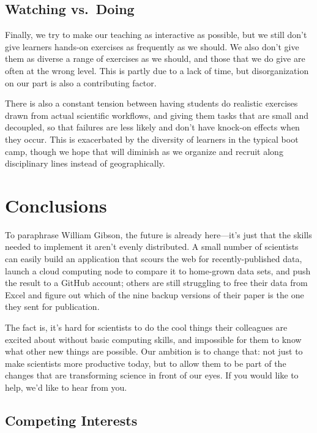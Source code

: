 \documentclass[10pt,a4paper,twocolumn]{article}
\begin{document}
\subsection*{Watching vs.~Doing}

Finally, we try to make our teaching as interactive as possible, but we
still don't give learners hands-on exercises as frequently as we should.
We also don't give them as diverse a range of exercises as we should,
and those that we do give are often at the wrong level. This is partly
due to a lack of time, but disorganization on our part is also a
contributing factor.

There is also a constant tension between having students do realistic
exercises drawn from actual scientific workflows, and giving them tasks
that are small and decoupled, so that failures are less likely and don't
have knock-on effects when they occur. This is exacerbated by the
diversity of learners in the typical boot camp, though we hope that will
diminish as we organize and recruit along disciplinary lines instead of
geographically.

\section*{Conclusions}

To paraphrase William Gibson, the future is already here---it's just
that the skills needed to implement it aren't evenly distributed. A
small number of scientists can easily build an application that scours
the web for recently-published data, launch a cloud computing node to
compare it to home-grown data sets, and push the result to a GitHub
account; others are still struggling to free their data from Excel and
figure out which of the nine backup versions of their paper is the one
they sent for publication.

The fact is, it's hard for scientists to do the cool things their
colleagues are excited about without basic computing skills, and
impossible for them to know what other new things are possible. Our
ambition is to change that: not just to make scientists more productive
today, but to allow them to be part of the changes that are transforming
science in front of our eyes. If you would like to help, we'd like to
hear from you.

\subsection*{Competing Interests}
\end{document}
